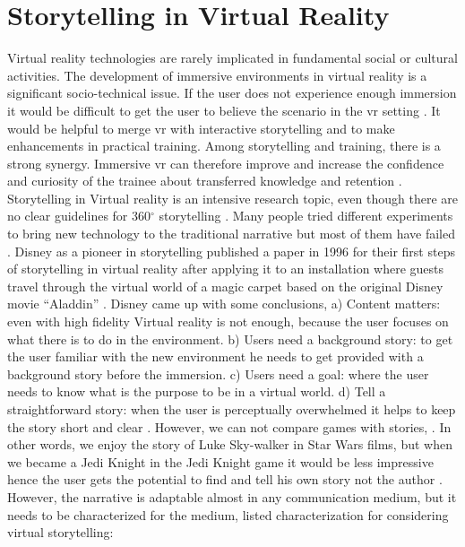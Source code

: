 \section{Storytelling in Virtual Reality}

Virtual reality technologies are rarely implicated in fundamental social or cultural activities. The development of immersive environments in virtual reality is a significant socio-technical issue. If the user does not experience enough immersion it would be difficult to get the user to believe the scenario in the \acrshort{vr} setting \citep{Darcy2003VirtualStorytelling, Steinicke2016}. It would be helpful to merge \acrlong{vr} with interactive storytelling and to make enhancements in practical training. Among storytelling and training, there is a strong synergy. Immersive \acrshort{vr} can therefore improve and increase the confidence and curiosity of the trainee about transferred knowledge and retention \citep{Ponder2003ImmersiveTraining}. Storytelling in Virtual reality is an intensive research topic, even though there are no clear guidelines for 360$^{\circ}$ storytelling \citep{Gugenheimer2016SwiVRChair:Reality, Ponder2003ImmersiveTraining}. Many people tried different experiments to bring new technology to the traditional narrative but most of them have failed \citep{Balet2003VirtualProceedings}. Disney as a pioneer in storytelling published a paper in 1996 for their first steps of storytelling in virtual reality after applying it to an installation where guests travel through the virtual world of a magic carpet based on the original Disney movie “Aladdin” \citep{Pausch1996DisneysReality}. Disney came up with some conclusions, a) Content matters: even with high fidelity Virtual reality is not enough, because the user focuses on what there is to do in the environment. b) Users need a background story: to get the user familiar with the new environment he needs to get provided with a background story before the immersion. c) Users need a goal: where the user needs to know what is the purpose to be in a virtual world. d) Tell a straightforward story: when the user is perceptually overwhelmed it helps to keep the story short and clear \citep{Pausch1996DisneysReality}. However, we can not compare games with stories, \cite [p.52]{Balet2003VirtualProceedings}. In other words, we enjoy the story of Luke Sky-walker in Star Wars films, but when we became a Jedi Knight in the Jedi Knight game it would be less impressive hence the user gets the potential to find and tell his own story not the author \citep{Balet2003VirtualProceedings}. However, the narrative is adaptable almost in any communication medium, but it needs to be characterized for the medium, \citep{Balet2003VirtualProceedings} listed characterization for considering virtual storytelling:

